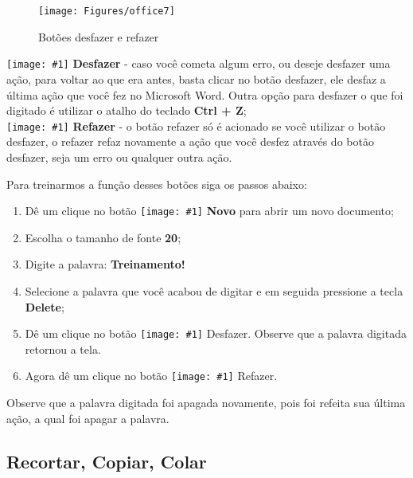\documentclass[12pt]{article}
\newcommand{\icon}[1]{\texttt{[image: \#1]}}
\begin{document}
	
	\begin{figure}[!h]
		\centering
		\texttt{[image: Figures/office7]}
		\label{fig:office7}
		\caption{Botões desfazer e refazer}
	\end{figure}
	
	\icon{Figures/desfazer} \textbf{Desfazer} - caso você cometa algum erro, ou deseje desfazer uma ação, para voltar ao que era antes, basta clicar no botão desfazer, ele desfaz a última ação que você fez no Microsoft Word. Outra opção para desfazer o que foi digitado é utilizar o atalho do teclado \textbf{Ctrl + Z};\\
	
	\icon{Figures/refazer} \textbf{Refazer} - o botão refazer só é acionado se você utilizar o botão desfazer, o refazer refaz novamente a ação que você desfez através do botão desfazer, seja um erro ou qualquer outra ação.
	
	Para treinarmos a função desses botões siga os passos abaixo:
	
	\begin{enumerate}
		\item Dê um clique no botão \icon{Figures/novo} \textbf{Novo} para abrir um novo documento;
		
		\item Escolha o tamanho de fonte \textbf{20};
		
		\item  Digite a palavra: \textbf{Treinamento!}
		
		
		\item Selecione a palavra que você acabou de digitar e em seguida pressione a tecla \textbf{Delete};
		
		\item Dê um clique no botão \icon{Figures/desfazer} Desfazer. Observe que a palavra digitada retornou  a tela.                                                               
		
		\item Agora dê um clique no botão \icon{Figures/refazer} Refazer.
	\end{enumerate}

	Observe que a palavra digitada foi apagada novamente, pois foi refeita sua última ação, a qual foi apagar a palavra.            
	
	
	\subsection{Recortar, Copiar, Colar}
	
\end{document}
